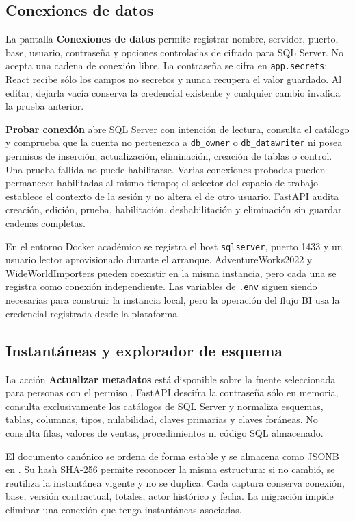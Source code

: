 \documentclass[11pt,letterpaper]{article}
\newcommand{\file}[1]{\texttt{#1}}
\begin{document}
\subsection{Conexiones de datos}

La pantalla \textbf{Conexiones de datos} permite registrar nombre, servidor, puerto, base, usuario, contraseña y opciones controladas de cifrado para SQL Server. No acepta una cadena de conexión libre. La contraseña se cifra en \file{app.secrets}; React recibe sólo los campos no secretos y nunca recupera el valor guardado. Al editar, dejarla vacía conserva la credencial existente y cualquier cambio invalida la prueba anterior.

\textbf{Probar conexión} abre SQL Server con intención de lectura, consulta el catálogo y comprueba que la cuenta no pertenezca a \file{db\_owner} o \file{db\_datawriter} ni posea permisos de inserción, actualización, eliminación, creación de tablas o control. Una prueba fallida no puede habilitarse. Varias conexiones probadas pueden permanecer habilitadas al mismo tiempo; el selector del espacio de trabajo establece el contexto de la sesión y no altera el de otro usuario. FastAPI audita creación, edición, prueba, habilitación, deshabilitación y eliminación sin guardar cadenas completas.

En el entorno Docker académico se registra el host \file{sqlserver}, puerto 1433 y un usuario lector aprovisionado durante el arranque. AdventureWorks2022 y WideWorldImporters pueden coexistir en la misma instancia, pero cada una se registra como conexión independiente. Las variables de \file{.env} siguen siendo necesarias para construir la instancia local, pero la operación del flujo BI usa la credencial registrada desde la plataforma.

\subsection{Instantáneas y explorador de esquema}

La acción \textbf{Actualizar metadatos} está disponible sobre la fuente seleccionada para personas con el permiso . FastAPI descifra la contraseña sólo en memoria, consulta exclusivamente los catálogos de SQL Server y normaliza esquemas, tablas, columnas, tipos, nulabilidad, claves primarias y claves foráneas. No consulta filas, valores de ventas, procedimientos ni código SQL almacenado.

El documento canónico se ordena de forma estable y se almacena como JSONB en . Su hash SHA-256 permite reconocer la misma estructura: si no cambió, se reutiliza la instantánea vigente y no se duplica. Cada captura conserva conexión, base, versión contractual, totales, actor histórico y fecha. La migración  impide eliminar una conexión que tenga instantáneas asociadas.
\end{document}
